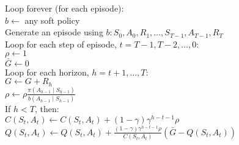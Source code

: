 \begin{solution}
\begin{tcolorbox}[title = {Off-policy MC control, for estimating $\pi \approx \pi_\ast$, using \eqref{eq:5.10'}}]
    Loop forever (for each episode): \\
    \hspace*{0.5cm} $b \leftarrow$ any soft policy \\
    \hspace*{0.5cm} Generate an episode using $b: S_0, A_0, R_1, \dots, S_{T-1}, A_{T-1}, R_T$ \\
    \hspace*{0.5cm} Loop for each step of episode, $t = T-1, T-2, \dots, 0$: \\
    \hspace*{0.5cm} \hspace*{0.5cm} $\rho \leftarrow 1$ \\
    \hspace*{0.5cm} \hspace*{0.5cm} $\bar G \leftarrow 0$ \\
    \hspace*{0.5cm} \hspace*{0.5cm} Loop for each horizon, $h = t+1, \dots, T$: \\
    \hspace*{0.5cm} \hspace*{0.5cm} \hspace*{0.5cm} $G \leftarrow G + R_h$ \\
    \hspace*{0.5cm} \hspace*{0.5cm} \hspace*{0.5cm} $\rho \leftarrow \rho \frac{\pi(A_{h-1} \mid S_{h-1})}{b(A_{h-1} \mid S_{h-1})}$ \\
    \hspace*{0.5cm} \hspace*{0.5cm} \hspace*{0.5cm} If $h < T$, then: \\
    \hspace*{0.5cm} \hspace*{0.5cm} \hspace*{0.5cm} \hspace*{0.5cm} $C(S_t, A_t) \leftarrow C(S_t, A_t) + (1 - \gamma) \gamma^{h-t-1} \rho$ \\
    \hspace*{0.5cm} \hspace*{0.5cm} \hspace*{0.5cm} \hspace*{0.5cm} $Q(S_t, A_t) \leftarrow Q(S_t, A_t) + \frac{(1 - \gamma) \gamma^{h-t-1} \rho}{C(S_t, A_t)} (\bar G - Q(S_t, A_t))$ \\

\end{tcolorbox}
\end{solution}

